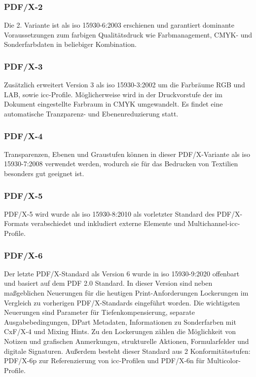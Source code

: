 \subsubsection{PDF/X-2}
Die 2. Variante ist als \gls{iso} 15930-6:2003 erschienen und garantiert dominante Voraussetzungen zum farbigen Qualitätsdruck wie Farbmanagement, CMYK- und Sonderfarbdaten in beliebiger Kombination. \cite{proj-consult}

\subsubsection{PDF/X-3}
Zusätzlich erweitert Version 3 als \gls{iso} 15930-3:2002 \cite{proj-consult} um die Farbräume RGB und LAB, sowie \gls{icc}-Profile. Möglicherweise wird in der Druckvorstufe der im Dokument eingestellte Farbraum in CMYK umgewandelt. Es findet eine automatische Tranzparenz- und Ebenenreduzierung statt. \cite{adobe-pdf-x}

\subsubsection{PDF/X-4}
Transparenzen, Ebenen und Graustufen können in dieser PDF/X-Variante als \gls{iso} 15930-7:2008 \cite{proj-consult} verwendet werden, wodurch sie für das Bedrucken von Textilien besonders gut geeignet ist. \cite{adobe-pdf-x} 

\subsubsection{PDF/X-5}
PDF/X-5 wird wurde als \gls{iso} 15930-8:2010 als vorletzter Standard des PDF/X-Formats verabschiedet und inkludiert externe Elemente und Multichannel-\gls{icc}-Profile. \cite{proj-consult}

\subsubsection{PDF/X-6}
Der letzte PDF/X-Standard als Version 6 wurde in \gls{iso} 15930-9:2020 offenbart und basiert auf dem PDF 2.0 Standard. In dieser Version sind neben maßgeblichen Neuerungen für die heutigen Print-Anforderungen Lockerungen im Vergleich zu vorherigen PDF/X-Standards eingeführt worden. Die wichtigsten Neuerungen sind Parameter für Tiefenkompensierung, separate Ausgabebedingungen, DPart Metadaten, Informationen zu Sonderfarben mit CxF/X-4 und Mixing Hints.
Zu den Lockerungen zählen die Möglichkeit von Notizen und grafischen Anmerkungen, strukturelle Aktionen, Formularfelder und digitale Signaturen. Außerdem besteht dieser Standard aus 2 Konformitätsstufen: PDF/X-6p zur Referenzierung von \gls{icc}-Profilen und PDF/X-6n für Multicolor-Profile. \cite{proj-consult}


